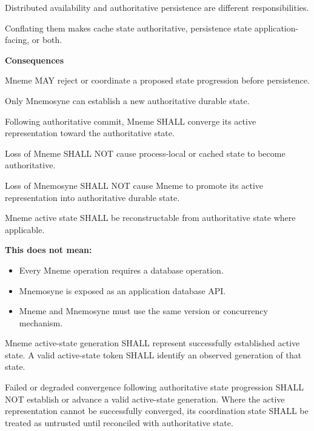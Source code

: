 Distributed availability and authoritative persistence are different
responsibilities.



Conflating them makes cache state authoritative, persistence state
application-facing, or both.



\par\medskip\textbf{Consequences}\par


Mneme MAY reject or coordinate a proposed state progression before
persistence.



Only Mnemosyne can establish a new authoritative durable state.



Following authoritative commit, Mneme SHALL converge its active
representation toward the authoritative state.



Loss of Mneme SHALL NOT cause process-local or cached state to become
authoritative.



Loss of Mnemosyne SHALL NOT cause Mneme to promote its active
representation into authoritative durable state.



Mneme active state SHALL be reconstructable from authoritative state
where applicable.



\textbf{This does not mean:}



\begin{itemize}


\item Every Mneme operation requires a database operation.

\item Mnemosyne is exposed as an application database API.

\item Mneme and Mnemosyne must use the same version or concurrency mechanism.

\end{itemize}


Mneme active-state generation SHALL represent successfully established active state. A valid active-state token SHALL identify an observed generation of that state.



Failed or degraded convergence following authoritative state progression SHALL NOT establish or advance a valid active-state generation. Where the active representation cannot be successfully converged, its coordination state SHALL be treated as untrusted until reconciled with authoritative state.



